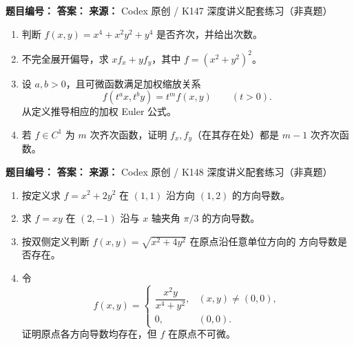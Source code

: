 \begin{problemBox}
\begin{problemMeta}
\textbf{题目编号：}  \quad
\textbf{答案：}  \quad
\textbf{来源：} Codex 原创 / K147 深度讲义配套练习（非真题）
\end{problemMeta}
\begin{enumerate}
\item[\textbf{A}] 判断 \(f(x,y)=x^4+x^2y^2+y^4\) 是否齐次，并给出次数。
\item[\textbf{B}] 不完全展开偏导，求
\(x f_x+y f_y\)，其中 \(f=(x^2+y^2)^2\)。
\item[\textbf{C}] 设 \(a,b>0\)，且可微函数满足加权缩放关系
\[
f(t^a x,t^b y)=t^m f(x,y)\qquad(t>0).
\]
从定义推导相应的加权 Euler 公式。
\item[\textbf{M}] 若 \(f\in C^1\) 为 \(m\) 次齐次函数，证明
\(f_x,f_y\)（在其存在处）都是 \(m-1\) 次齐次函数。
\end{enumerate}
\end{problemBox}

\begin{problemBox}
\begin{problemMeta}
\textbf{题目编号：}  \quad
\textbf{答案：}  \quad
\textbf{来源：} Codex 原创 / K148 深度讲义配套练习（非真题）
\end{problemMeta}
\begin{enumerate}
\item[\textbf{A}] 按定义求 \(f=x^2+2y^2\) 在 \((1,1)\) 沿方向 \((1,2)\) 的方向导数。
\item[\textbf{B}] 求 \(f=xy\) 在 \((2,-1)\) 沿与 \(x\) 轴夹角 \(\pi/3\) 的方向导数。
\item[\textbf{C}] 按双侧定义判断 \(f(x,y)=\sqrt{x^2+4y^2}\) 在原点沿任意单位方向的
方向导数是否存在。
\item[\textbf{M}] 令
\[
f(x,y)=
\begin{cases}\dfrac{x^2y}{x^4+y^2},&(x,y)\ne(0,0),\\0,&(0,0).\end{cases}
\]
证明原点各方向导数均存在，但 \(f\) 在原点不可微。
\end{enumerate}
\end{problemBox}

